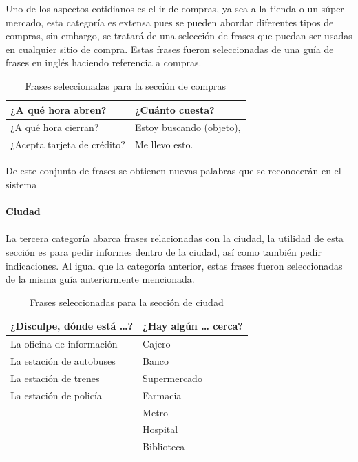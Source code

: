 Uno de los aspectos cotidianos es el ir de compras, ya sea a la tienda o un súper mercado, esta categoría es extensa pues se pueden abordar diferentes tipos de compras, sin embargo, se tratará de una selección de frases que puedan ser usadas en cualquier sitio de compra. Estas frases fueron seleccionadas de una guía de frases en inglés haciendo referencia a compras. 

\begin{table}[H]
\centering
\caption{Frases seleccionadas para la sección de compras}
\label{tb:comprasFrases}
\begin{tabular}{|l|l|}
\hline
¿A qué hora abren?          & ¿Cuánto cuesta?          \\ \hline
¿A qué hora cierran?        & Estoy buscando (objeto), \\ \hline
¿Acepta tarjeta de crédito? & Me llevo esto.           \\ \hline
\end{tabular}
\end{table}
 
De este conjunto de frases se obtienen nuevas palabras que se reconocerán en el sistema

\paragraph{Ciudad}\paragraph{}

La tercera categoría abarca frases relacionadas con la ciudad, la utilidad de esta sección es para pedir informes dentro de la ciudad, así como también pedir indicaciones. Al igual que la categoría anterior, estas frases fueron seleccionadas de la misma guía anteriormente mencionada. 

\begin{table}[H]
\centering
\caption{Frases seleccionadas para la sección de ciudad}
\label{tb:ciudadFrases}
\begin{tabular}{|l|l|}
\hline
¿Disculpe, dónde está …?  & ¿Hay algún … cerca? \\ \hline
La oficina de información & Cajero              \\ \hline
La estación de autobuses  & Banco               \\ \hline
La estación de trenes     & Supermercado        \\ \hline
La estación de policía    & Farmacia            \\ \hline
                          & Metro               \\ \hline
                          & Hospital            \\ \hline
                          & Biblioteca          \\ \hline
\end{tabular}
\end{table}
 
